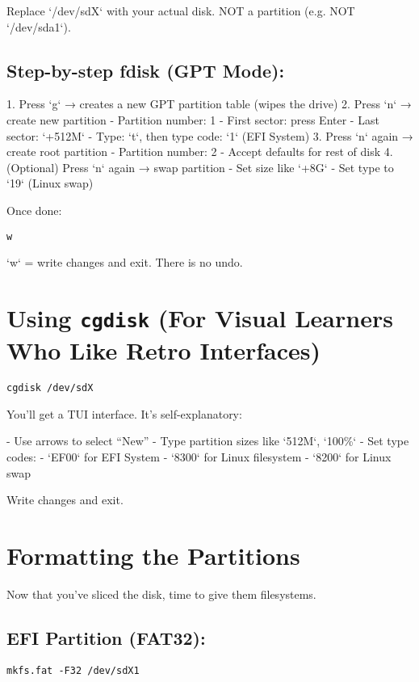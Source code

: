 \documentclass[12pt,openany]{book}
\begin{document}
Replace `/dev/sdX` with your actual disk. NOT a partition (e.g. NOT `/dev/sda1`).

\subsection*{Step-by-step fdisk (GPT Mode):}

1. Press `g` → creates a new GPT partition table (wipes the drive)
2. Press `n` → create new partition
   - Partition number: 1
   - First sector: press Enter
   - Last sector: `+512M`
   - Type: `t`, then type code: `1` (EFI System)
3. Press `n` again → create root partition
   - Partition number: 2
   - Accept defaults for rest of disk
4. (Optional) Press `n` again → swap partition
   - Set size like `+8G`
   - Set type to `19` (Linux swap)

Once done:

\begin{lstlisting}
w
\end{lstlisting}

`w` = write changes and exit. There is no undo.

\section{Using \texttt{cgdisk} (For Visual Learners Who Like Retro Interfaces)}

\begin{lstlisting}
cgdisk /dev/sdX
\end{lstlisting}

You’ll get a TUI interface. It’s self-explanatory:

- Use arrows to select “New”
- Type partition sizes like `512M`, `100\%`
- Set type codes:
  - `EF00` for EFI System
  - `8300` for Linux filesystem
  - `8200` for Linux swap

Write changes and exit.

\section{Formatting the Partitions}

Now that you’ve sliced the disk, time to give them filesystems.

\subsection*{EFI Partition (FAT32):}

\begin{lstlisting}
mkfs.fat -F32 /dev/sdX1
\end{lstlisting}
\end{document}
